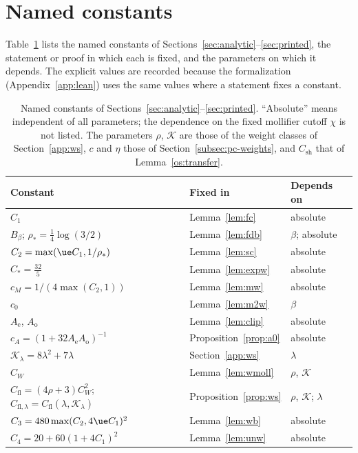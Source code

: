 \section{Named constants}\label{app:constants}
Table~\ref{tab:constants} lists the named constants of Sections~\ref{sec:analytic}--\ref{sec:printed}, the statement or proof in
which each is fixed, and the parameters on which it depends. The explicit values are recorded because the formalization
(Appendix~\ref{app:lean}) uses the same values where a statement fixes a constant.

\begin{table}[htb]
\centering\small
\caption{Named constants of Sections~\ref{sec:analytic}--\ref{sec:printed}. ``Absolute'' means independent of all parameters;
the dependence on the fixed mollifier cutoff $\chi$ is not listed. The parameters $\rho$, $\mathcal K$ are those of the weight classes
of Section~\ref{app:ws}, $c$ and $\eta$ those of Section~\ref{subsec:pc-weights}, and $C_{\mathrm{sh}}$ that of Lemma~\ref{os:transfer}.}\label{tab:constants}
\begin{tabular}{@{}lll@{}}
\hline
Constant & Fixed in & Depends on\\
\hline
$C_1$ & Lemma~\ref{lem:fc} & absolute\\
$B_\beta$; $\rho_*=\tfrac14\log(3/2)$ & Lemma~\ref{lem:fdb} & $\beta$; absolute\\
$C_2=\max(\ue C_1,1/\rho_*)$ & Lemma~\ref{lem:sc} & absolute\\
$C_*=\tfrac{32}5$ & Lemma~\ref{lem:expw} & absolute\\
$c_M=1/(4\max(C_2,1))$ & Lemma~\ref{lem:mw} & absolute\\
$c_0$ & Lemma~\ref{lem:m2w} & $\beta$\\
$A_{\mathrm e}$, $A_{\mathrm o}$ & Lemma~\ref{lem:clip} & absolute\\
$c_A=(1+32A_{\mathrm e}A_{\mathrm o})^{-1}$ & Proposition~\ref{prop:a0} & absolute\\
$\mathcal K_\lambda=8\lambda^2+7\lambda$ & Section~\ref{app:ws} & $\lambda$\\
$C_W$ & Lemma~\ref{lem:wmoll} & $\rho$, $\mathcal K$\\
$C_{\mathrm{fl}}=(4\rho+3)C_W^2$; $C_{\mathrm{fl},\lambda}=C_{\mathrm{fl}}(\lambda,\mathcal K_\lambda)$ & Proposition~\ref{prop:ws} & $\rho$, $\mathcal K$; $\lambda$\\
$C_3=480\max(C_2,4\ue C_1)^2$ & Lemma~\ref{lem:wb} & absolute\\
$C_4=20+60(1+4C_1)^2$ & Lemma~\ref{lem:unw} & absolute\\

\end{tabular}
\end{table}
